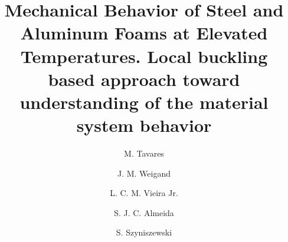 \documentclass[review]{elsarticle}
\begin{document}
\begin{frontmatter}

\title{Mechanical Behavior of Steel and Aluminum Foams at Elevated Temperatures. Local buckling based approach toward understanding of the material system behavior}


\author[mymainaddress]{M. Tavares}
\author[mysecondaryaddress]{J. M. Weigand}
\author[mymainaddress]{L. C. M. Vieira Jr.}
\author[mymainaddress]{S. J. C. Almeida}
\author[mythirdaddress]{S. Szyniszewski}

\address[mymainaddress]{Department of Structural Engineering, State University of Campinas, Campinas, Brazil}
\address[mysecondaryaddress]{National Institute of Standards and Technology (NIST), Gaithersburg, Maryland, USA}
\address[mythirdaddress]{Department of Engineering, Durham University, Durham, UK}



\end{frontmatter}
\end{document}
